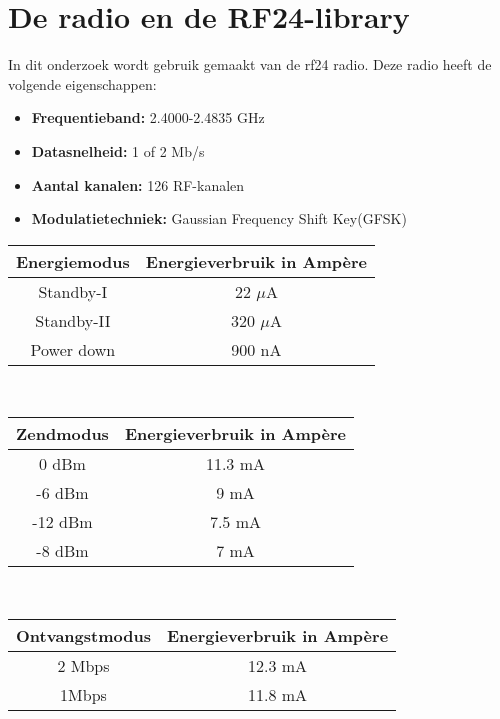 \documentclass{article}
\begin{document}
\section{De radio en de RF24-library}
In dit onderzoek wordt gebruik gemaakt van de rf24 radio. Deze radio heeft de volgende eigenschappen:
	\begin{itemize}	
	\item\textbf{Frequentieband: }2.4000-2.4835 GHz
	\item\textbf{Datasnelheid: }1 of 2 Mb/s
	\item\textbf{Aantal kanalen: }126 RF-kanalen
	\item\textbf{Modulatietechniek: }Gaussian Frequency Shift Key(GFSK)
	\end{itemize}
\begin{tabular}{c||c}
\textbf{Energiemodus}  & \textbf{Energieverbruik in Amp\`ere}     \\
\hline
Standby-I   & 22 $\mu$A    \\
Standby-II  & 320 $\mu$A     \\
Power down  & 900 nA 
\end{tabular}\\
\begin{tabular}{c||c}
\textbf{Zendmodus}  & \textbf{Energieverbruik in Amp\`ere}     \\
\hline
0 dBm  & 11.3 mA    \\
-6 dBm & 9 mA     \\
-12 dBm & 7.5 mA  \\
-8 dBm & 7 mA
\end{tabular}\\
\begin{tabular}{c||c}
\textbf{Ontvangstmodus}  & \textbf{Energieverbruik in Amp\`ere}     \\
\hline
2 Mbps   & 12.3 mA    \\
1Mbps & 11.8 mA     
\end{tabular}
\end{document}
